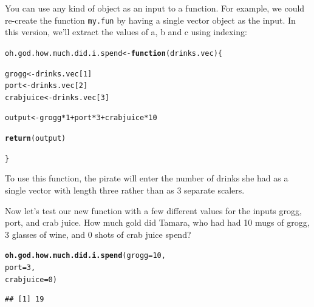 \documentclass{tufte-book}\usepackage[]{graphicx}\usepackage[]{color}
\makeatletter
\newcommand{\hlnum}[1]{\textcolor[rgb]{0.686,0.059,0.569}{#1}}%
\newcommand{\hlopt}[1]{\textcolor[rgb]{0,0,0}{#1}}%
\newcommand{\hlstd}[1]{\textcolor[rgb]{0.345,0.345,0.345}{#1}}%
\newcommand{\hlkwa}[1]{\textcolor[rgb]{0.161,0.373,0.58}{\textbf{#1}}}%
\newcommand{\hlkwb}[1]{\textcolor[rgb]{0.69,0.353,0.396}{#1}}%
\newcommand{\hlkwc}[1]{\textcolor[rgb]{0.333,0.667,0.333}{#1}}%
\newcommand{\hlkwd}[1]{\textcolor[rgb]{0.737,0.353,0.396}{\textbf{#1}}}%
\newenvironment{kframe}{%
 \def\at@end@of@kframe{}%
 \ifinner\ifhmode%
  \def\at@end@of@kframe{\end{minipage}}%
  \begin{minipage}{\columnwidth}%
 \fi\fi%
 \def\FrameCommand##1{\hskip\@totalleftmargin \hskip-\fboxsep
 \colorbox{shadecolor}{##1}\hskip-\fboxsep
     \hskip-\linewidth \hskip-\@totalleftmargin \hskip\columnwidth}%
 \MakeFramed {\advance\hsize-\width
   \@totalleftmargin\z@ \linewidth\hsize
   \@setminipage}}%
 {\par\unskip\endMakeFramed%
 \at@end@of@kframe}
\newenvironment{knitrout}{}{} %
\makeatother
\begin{document}
\begin{marginfigure}
You can use any kind of object as an input to a function. For example, we could re-create the function \texttt{my.fun} by having a single vector object as the input. In this version, we'll extract the values of a, b and c using indexing:
\begin{tiny}
\begin{knitrout}
\color{fgcolor}\begin{kframe}
\begin{alltt}
\hlstd{oh.god.how.much.did.i.spend} \hlkwb{<-} \hlkwa{function}\hlstd{(}\hlkwc{drinks.vec}\hlstd{) \{}

  \hlstd{grogg} \hlkwb{<-} \hlstd{drinks.vec[}\hlnum{1}\hlstd{]}
  \hlstd{port} \hlkwb{<-} \hlstd{drinks.vec[}\hlnum{2}\hlstd{]}
  \hlstd{crabjuice} \hlkwb{<-} \hlstd{drinks.vec[}\hlnum{3}\hlstd{]}

  \hlstd{output} \hlkwb{<-} \hlstd{grogg} \hlopt{*} \hlnum{1} \hlopt{+} \hlstd{port} \hlopt{*} \hlnum{3} \hlopt{+} \hlstd{crabjuice} \hlopt{*} \hlnum{10}

  \hlkwd{return}\hlstd{(output)}

\hlstd{\}}
\end{alltt}
\end{kframe}
\end{knitrout}
\end{tiny}

To use this function, the pirate will enter the number of drinks she had as a single vector with length three rather than as 3 separate scalers.

\end{marginfigure}

Now let's test our new function with a few different values for the inputs grogg, port, and crab juice. How much gold did Tamara, who had had 10 mugs of grogg, 3 glasses of wine, and 0 shots of crab juice spend?

\begin{knitrout}
\color{fgcolor}\begin{kframe}
\begin{alltt}
\hlkwd{oh.god.how.much.did.i.spend}\hlstd{(}\hlkwc{grogg} \hlstd{=} \hlnum{10}\hlstd{,}
                            \hlkwc{port} \hlstd{=} \hlnum{3}\hlstd{,}
                            \hlkwc{crabjuice} \hlstd{=} \hlnum{0}\hlstd{)}
\end{alltt}
\begin{verbatim}
## [1] 19
\end{verbatim}
\end{kframe}
\end{knitrout}
\end{document}
